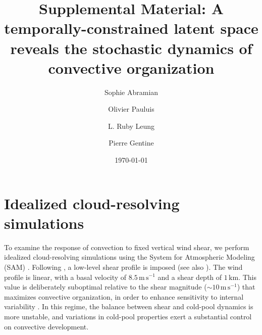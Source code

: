 \documentclass[
    aps,
    prl,
    reprint,
    superscriptaddress,
    amsmath,amssymb,
    nofootinbib,
    floatfix
]{revtex4-2}
\begin{document}
\title{Supplemental Material: A temporally-constrained latent space reveals the stochastic dynamics of convective organization}

\author{Sophie Abramian}

\author{Olivier Pauluis}

\author{L. Ruby Leung}

\author{Pierre Gentine}

\date{\today}

\maketitle
\onecolumngrid   %
\linenumbers

\makeatletter
\renewcommand{\l@subsection}[2]{}
\makeatother
\tableofcontents

\newpage

\section{Idealized cloud-resolving simulations}

To examine the response of convection to fixed vertical wind shear, we perform idealized cloud-resolving simulations using the System for Atmospheric Modeling (SAM) \cite{khairoutdinov2003}. Following \cite{muller2013impact}, a low-level shear profile is imposed (see also \cite{rotunno1988theory, houze1977structure, robe2001effect}). The wind profile is linear, with a basal velocity of $8.5\,\mathrm{m\,s^{-1}}$ and a shear depth of $1\,\mathrm{km}$. This value is deliberately suboptimal relative to the shear magnitude ($\sim10\,\mathrm{m\,s^{-1}}$) that maximizes convective organization, in order to enhance sensitivity to internal variability \cite{abramian2022shear}. In this regime, the balance between shear and cold-pool dynamics is more unstable, and variations in cold-pool properties exert a substantial control on convective development.
\end{document}
